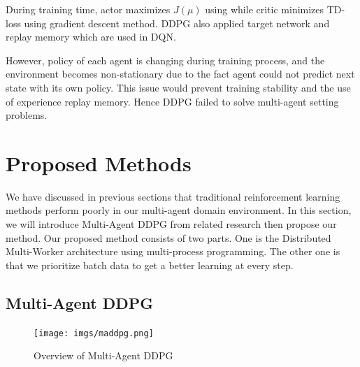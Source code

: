 \documentclass[11pt,twocolumn]{jarticle} %
\begin{document}
During training time, actor maximizes $J(\mu)$ using while critic minimizes TD-loss using gradient descent method. DDPG also applied target network and replay memory which are used in DQN. \par

However, policy of each agent is changing during training process, and the environment becomes non-stationary due to the fact agent could not predict next state with its own policy. This issue would prevent training stability and the use of experience replay memory. Hence DDPG failed to solve multi-agent setting problems. \par

\section{Proposed Methods}

We have discussed in previous sections that traditional reinforcement learning methods perform poorly in our multi-agent domain environment. In this section, we will introduce Multi-Agent DDPG from related research then propose our method. Our proposed method consists of two parts. One is the Distributed Multi-Worker architecture using multi-process programming. The other one is that we prioritize batch data to get a better learning at every step.

\subsection{Multi-Agent DDPG}

\begin{figure}[ht]
 \begin{center}
  \texttt{[image: imgs/maddpg.png]}
  \caption{Overview of Multi-Agent DDPG\cite{maddpg}}
  \label{fig:maddpg}
 \end{center}
\end{figure}
\end{document}
